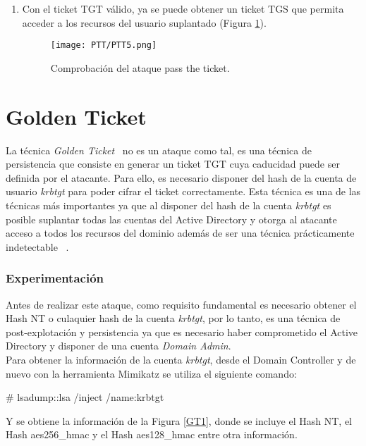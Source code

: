 \begin{enumerate}
\item Con el ticket TGT válido, ya se puede obtener un ticket TGS que permita acceder a los recursos del usuario suplantado (Figura \ref{PTT5}).
\begin{figure}[H] %
\begin{center}
\texttt{[image: PTT/PTT5.png]}
\end{center}
\caption{Comprobación del ataque pass the ticket.}
\label{PTT5}
\end{figure}

\end{enumerate}

\section{Golden Ticket}

La técnica {\it Golden Ticket}~\cite{Capitulo5:Kerberos} no es un ataque como tal, es una técnica de persistencia que consiste en generar un ticket TGT cuya caducidad puede ser definida por el atacante. Para ello, es necesario disponer del hash de la cuenta de usuario {\it krbtgt} para poder cifrar el ticket correctamente. Esta técnica es una de las técnicas más importantes ya que al disponer del hash de la cuenta {\it krbtgt} es posible suplantar todas las cuentas del Active Directory y otorga al atacante acceso a todos los recursos del dominio además de ser una técnica prácticamente indetectable ~\cite{Capitulo5:Golden}.

\subsubsection{Experimentación}

Antes de realizar este ataque, como requisito fundamental es necesario obtener el Hash NT o culaquier hash de la cuenta {\it krbtgt}, por lo tanto, es una técnica de post-explotación y persistencia ya que es necesario haber comprometido el Active Directory y disponer de una cuenta {\it Domain Admin}. \\

Para obtener la información de la cuenta {\it krbtgt}, desde el Domain Controller y de nuevo con la herramienta Mimikatz se utiliza el siguiente comando:
\begin{listing}[style=consola, numbers=none]
# lsadump::lsa /inject /name:krbtgt
\end{listing}

Y se obtiene la información de la Figura \ref{GT1}, donde se incluye el Hash NT, el Hash aes256\_hmac y el Hash aes128\_hmac entre otra información. 

